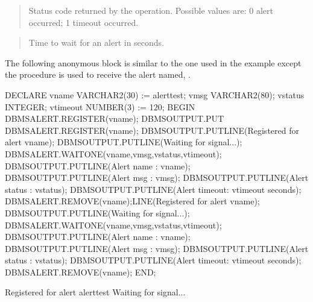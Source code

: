 \documentclass[letterpaper,10pt,english,openany,oneside]{sphinxmanual}
\begin{document}
\begin{quote}

Status code returned by the operation. Possible values are: 0 \textendash{} alert
occurred; 1 \textendash{} timeout occurred.
\end{quote}

\begin{quote}

Time to wait for an alert in seconds.
\end{quote}

\newpage


The following anonymous block is similar to the one used in the 
example except the  procedure is used to receive the alert named,
.

%
\begin{sphinxVerbatim}[commandchars=\\\{\}]
DECLARE
    v\PYGZus{}name           VARCHAR2(30) := \PYGZsq{}alert\PYGZus{}test\PYGZsq{};
    v\PYGZus{}msg            VARCHAR2(80);
    v\PYGZus{}status         INTEGER;
    v\PYGZus{}timeout        NUMBER(3) := 120;
BEGIN
   DBMS\PYGZus{}ALERT.REGISTER(v\PYGZus{}name);
   DBMS\PYGZus{}OUTPUT.PUT\PYGZus{}  DBMS\PYGZus{}ALERT.REGISTER(v\PYGZus{}name);
   DBMS\PYGZus{}OUTPUT.PUT\PYGZus{}LINE(\PYGZsq{}Registered for alert \PYGZsq{} \textbar{}\textbar{} v\PYGZus{}name);
   DBMS\PYGZus{}OUTPUT.PUT\PYGZus{}LINE(\PYGZsq{}Waiting for signal...\PYGZsq{});
   DBMS\PYGZus{}ALERT.WAITONE(v\PYGZus{}name,v\PYGZus{}msg,v\PYGZus{}status,v\PYGZus{}timeout);
   DBMS\PYGZus{}OUTPUT.PUT\PYGZus{}LINE(\PYGZsq{}Alert name   : \PYGZsq{} \textbar{}\textbar{} v\PYGZus{}name);
   DBMS\PYGZus{}OUTPUT.PUT\PYGZus{}LINE(\PYGZsq{}Alert msg    : \PYGZsq{} \textbar{}\textbar{} v\PYGZus{}msg);
   DBMS\PYGZus{}OUTPUT.PUT\PYGZus{}LINE(\PYGZsq{}Alert status : \PYGZsq{} \textbar{}\textbar{} v\PYGZus{}status);
   DBMS\PYGZus{}OUTPUT.PUT\PYGZus{}LINE(\PYGZsq{}Alert timeout: \PYGZsq{} \textbar{}\textbar{} v\PYGZus{}timeout \textbar{}\textbar{} \PYGZsq{} seconds\PYGZsq{});
   DBMS\PYGZus{}ALERT.REMOVE(v\PYGZus{}name);LINE(\PYGZsq{}Registered for alert \PYGZsq{} \textbar{}\textbar{} v\PYGZus{}name);
   DBMS\PYGZus{}OUTPUT.PUT\PYGZus{}LINE(\PYGZsq{}Waiting for signal...\PYGZsq{});
   DBMS\PYGZus{}ALERT.WAITONE(v\PYGZus{}name,v\PYGZus{}msg,v\PYGZus{}status,v\PYGZus{}timeout);
   DBMS\PYGZus{}OUTPUT.PUT\PYGZus{}LINE(\PYGZsq{}Alert name   : \PYGZsq{} \textbar{}\textbar{} v\PYGZus{}name);
   DBMS\PYGZus{}OUTPUT.PUT\PYGZus{}LINE(\PYGZsq{}Alert msg    : \PYGZsq{} \textbar{}\textbar{} v\PYGZus{}msg);
   DBMS\PYGZus{}OUTPUT.PUT\PYGZus{}LINE(\PYGZsq{}Alert status : \PYGZsq{} \textbar{}\textbar{} v\PYGZus{}status);
   DBMS\PYGZus{}OUTPUT.PUT\PYGZus{}LINE(\PYGZsq{}Alert timeout: \PYGZsq{} \textbar{}\textbar{} v\PYGZus{}timeout \textbar{}\textbar{} \PYGZsq{} seconds\PYGZsq{});
   DBMS\PYGZus{}ALERT.REMOVE(v\PYGZus{}name);
   END;

   Registered for alert alert\PYGZus{}test
   Waiting for signal...
\end{sphinxVerbatim}
\end{document}
